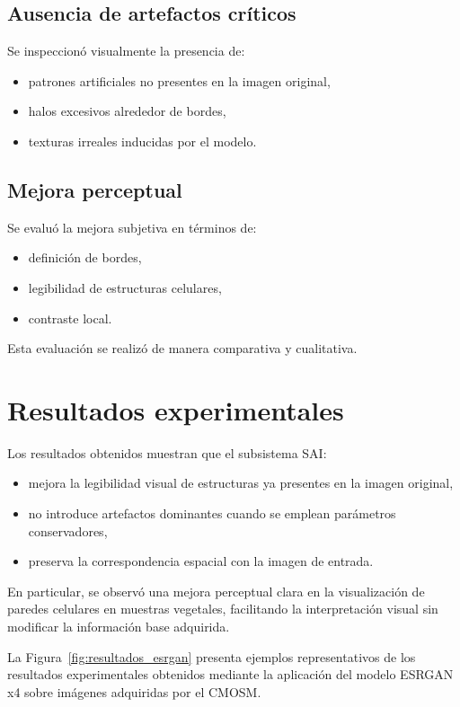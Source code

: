 \subsection{Ausencia de artefactos críticos}
Se inspeccionó visualmente la presencia de:
\begin{itemize}
    \item patrones artificiales no presentes en la imagen original,
    \item halos excesivos alrededor de bordes,
    \item texturas irreales inducidas por el modelo.
\end{itemize}

\subsection{Mejora perceptual}
Se evaluó la mejora subjetiva en términos de:
\begin{itemize}
    \item definición de bordes,
    \item legibilidad de estructuras celulares,
    \item contraste local.
\end{itemize}

Esta evaluación se realizó de manera comparativa y cualitativa.

\section{Resultados experimentales}

Los resultados obtenidos muestran que el subsistema SAI:

\begin{itemize}
    \item mejora la legibilidad visual de estructuras ya presentes en la imagen
    original,
    \item no introduce artefactos dominantes cuando se emplean parámetros
    conservadores,
    \item preserva la correspondencia espacial con la imagen de entrada.
\end{itemize}

En particular, se observó una mejora perceptual clara en la visualización de
paredes celulares en muestras vegetales, facilitando la interpretación visual
sin modificar la información base adquirida.

La Figura~\ref{fig:resultados_esrgan} presenta ejemplos representativos de los
resultados experimentales obtenidos mediante la aplicación del modelo ESRGAN x4
sobre imágenes adquiridas por el CMOSM.

